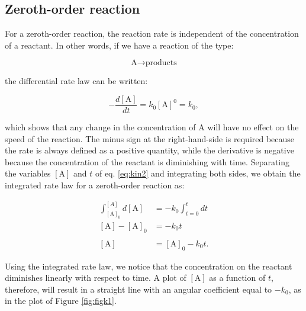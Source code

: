 \documentclass[
  9pt,
]{extbook}
\theoremstyle{definition}
\theoremstyle{definition}
\theoremstyle{definition}
\theoremstyle{remark}
\begin{document}
\hypertarget{zeroth-order-reaction}{%
\subsection{Zeroth-order reaction}\label{zeroth-order-reaction}}

For a zeroth-order reaction, the reaction rate is independent of the concentration of a reactant. In other words, if we have a reaction of the type:

\begin{equation}
\text{A}\longrightarrow\text{products}
\end{equation}

the differential rate law can be written:

\begin{equation}
- \frac{d[\mathrm{A}]}{dt}=k_0 [\mathrm{A}]^0 = k_0,
\label{eq:kin2}
\end{equation}

which shows that any change in the concentration of \(\mathrm{A}\) will have no effect on the speed of the reaction. The minus sign at the right-hand-side is required because the rate is always defined as a positive quantity, while the derivative is negative because the concentration of the reactant is diminishing with time.
Separating the variables \([\mathrm{A}]\) and \(t\) of eq. \eqref{eq:kin2} and integrating both sides, we obtain the integrated rate law for a zeroth-order reaction as:

\begin{equation}
\begin{aligned}
\int_{[\mathrm{A}]_0}^{[A]} d[\mathrm{A}] &= -k_0 \int_{t=0}^{t} dt \\
[\mathrm{A}]-[\mathrm{A}]_0 &= -k_0 t \\ \\
[\mathrm{A}]&=[\mathrm{A}]_0 -k_0 t.
\end{aligned}
\label{eq:kin3}
\end{equation}

Using the integrated rate law, we notice that the concentration on the reactant diminishes linearly with respect to time. A plot of \([\mathrm{A}]\) as a function of \(t\), therefore, will result in a straight line with an angular coefficient equal to \(-k_0\), as in the plot of Figure \ref{fig:figk1}.
\end{document}
